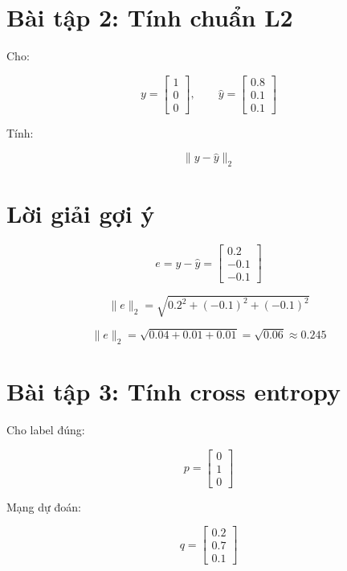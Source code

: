 \documentclass[12pt,a4paper]{report}
\begin{document}
\section*{Bài tập 2: Tính chuẩn L2}

Cho:

\[
    y =
    \begin{bmatrix}
    1\\0\\0
    \end{bmatrix},
    \qquad
    \hat{y} =
    \begin{bmatrix}
    0.8\\0.1\\0.1
    \end{bmatrix}
\]

Tính:

\[
    \|y-\hat{y}\|_2
\]

\section*{Lời giải gợi ý}

\[
    e=y-\hat{y}
    =
    \begin{bmatrix}
    0.2\\-0.1\\-0.1
    \end{bmatrix}
\]

\[
    \|e\|_2
    =
    \sqrt{0.2^2+(-0.1)^2+(-0.1)^2}
\]

\[
    \|e\|_2
    =
    \sqrt{0.04+0.01+0.01}
    =
    \sqrt{0.06}
    \approx 0.245
\]

\section*{Bài tập 3: Tính cross entropy}

Cho label đúng:

\[
    p =
    \begin{bmatrix}
    0\\1\\0
    \end{bmatrix}
\]

Mạng dự đoán:

\[
    q =
    \begin{bmatrix}
    0.2\\0.7\\0.1
    \end{bmatrix}
\]
\end{document}
